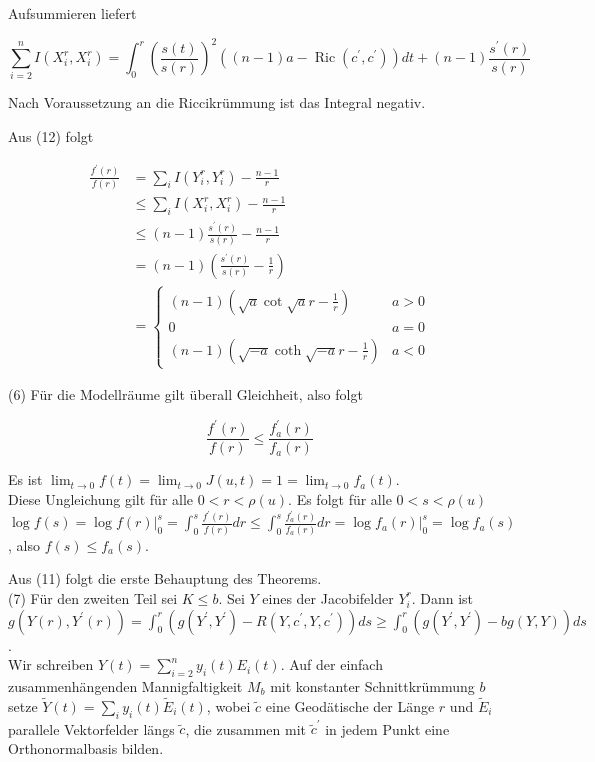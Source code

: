 \documentclass[10pt, letterpaper]{article}
\begin{document}
Aufsummieren liefert

$$
\sum_{i=2}^{n} I\left(X_{i}^{r}, X_{i}^{r}\right)=\int_{0}^{r}\left(\frac{s(t)}{s(r)}\right)^{2}\left((n-1) a-\operatorname{Ric}\left(c^{\prime}, c^{\prime}\right)\right) d t+(n-1) \frac{s^{\prime}(r)}{s(r)}
$$

Nach Voraussetzung an die Riccikrümmung ist das Integral negativ.

Aus (12) folgt

$$
\begin{aligned}
\frac{f^{\prime}(r)}{f(r)} & =\sum_{i} I\left(Y_{i}^{r}, Y_{i}^{r}\right)-\frac{n-1}{r} \\
& \leq \sum_{i} I\left(X_{i}^{r}, X_{i}^{r}\right)-\frac{n-1}{r} \\
& \leq(n-1) \frac{s^{\prime}(r)}{s(r)}-\frac{n-1}{r} \\
& =(n-1)\left(\frac{s^{\prime}(r)}{s(r)}-\frac{1}{r}\right) \\
& = \begin{cases}(n-1)\left(\sqrt{a} \cot \sqrt{a} r-\frac{1}{r}\right) & a>0 \\
0 & a=0 \\
(n-1)\left(\sqrt{-a} \operatorname{coth} \sqrt{-a} r-\frac{1}{r}\right) & a<0\end{cases}
\end{aligned}
$$

(6) Für die Modellräume gilt überall Gleichheit, also folgt

$$
\frac{f^{\prime}(r)}{f(r)} \leq \frac{f_{a}^{\prime}(r)}{f_{a}(r)}
$$

Es ist $\lim _{t \rightarrow 0} f(t)=\lim _{t \rightarrow 0} J(u, t)=1=\lim _{t \rightarrow 0} f_{a}(t)$.\\
Diese Ungleichung gilt für alle $0<r<\rho(u)$. Es folgt für alle $0<s<\rho(u)$\\
$\log f(s)=\left.\log f(r)\right|_{0} ^{s}=\int_{0}^{s} \frac{f^{\prime}(r)}{f(r)} d r \leq \int_{0}^{s} \frac{f_{a}^{\prime}(r)}{f_{a}(r)} d r=\left.\log f_{a}(r)\right|_{0} ^{s}=\log f_{a}(s)$, also $f(s) \leq f_{a}(s)$.

Aus (11) folgt die erste Behauptung des Theorems.\\
(7) Für den zweiten Teil sei $K \leq b$. Sei $Y$ eines der Jacobifelder $Y_{i}^{r}$. Dann ist\\
$g\left(Y(r), Y^{\prime}(r)\right)=\int_{0}^{r}\left(g\left(Y^{\prime}, Y^{\prime}\right)-R\left(Y, c^{\prime}, Y, c^{\prime}\right)\right) d s \geq \int_{0}^{r}\left(g\left(Y^{\prime}, Y^{\prime}\right)-b g(Y, Y)\right) d s$.\\
Wir schreiben $Y(t)=\sum_{i=2}^{n} y_{i}(t) E_{i}(t)$. Auf der einfach zusammenhängenden Mannigfaltigkeit $M_{b}$ mit konstanter Schnittkrümmung $b$ setze $\tilde{Y}(t)=\sum_{i} y_{i}(t) \tilde{E}_{i}(t)$, wobei $\tilde{c}$ eine Geodätische der Länge $r$ und $\tilde{E}_{i}$ parallele Vektorfelder längs $\tilde{c}$, die zusammen mit $\tilde{c}^{\prime}$ in jedem Punkt eine Orthonormalbasis bilden.
\end{document}
